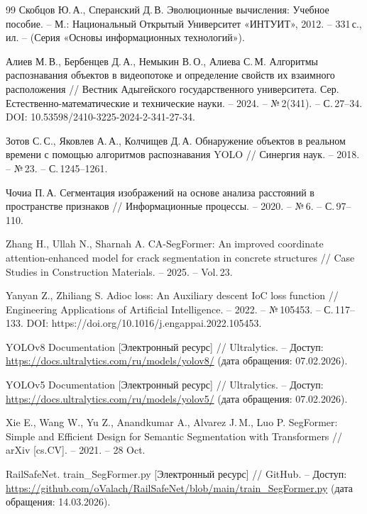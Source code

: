 \documentclass[areasetadvanced]{scrartcl}
\begin{document}
\newpage
{}
\begin{thebibliography}{99}
    Скобцов Ю.\,А., Сперанский Д.\,В. Эволюционные вычисления: Учебное пособие. – М.: Национальный Открытый Университет «ИНТУИТ», 2012. – 331\,с., ил. – (Серия «Основы информационных технологий»).

    Алиев М.\,В., Бербенцев Д.\,А., Немыкин В.\,О., Алиева С.\,М. Алгоритмы распознавания объектов в видеопотоке и определение свойств их взаимного расположения // Вестник Адыгейского государственного университета. Сер. Естественно-математические и технические науки. – 2024. – №\,2(341). – С.\,27–34. DOI: 10.53598/2410-3225-2024-2-341-27-34.

    Зотов С.\,С., Яковлев А.\,А., Колчищев Д.\,А. Обнаружение объектов в реальном времени с помощью алгоритмов распознавания YOLO // Синергия наук. – 2018. – №\,23. – С.\,1245–1261.

    Чочиа П.\,А. Сегментация изображений на основе анализа расстояний в пространстве признаков // Информационные процессы. – 2020. – №\,6. – С.\,97–110.

    Zhang H., Ullah N., Sharnah A. CA-SegFormer: An improved coordinate attention-enhanced model for crack segmentation in concrete structures // Case Studies in Construction Materials. – 2025. – Vol.\,23.

    Yanyan Z., Zhiliang S. Adioc loss: An Auxiliary descent IoC loss function // Engineering Applications of Artificial Intelligence. – 2022. – №\,105453. – С.\,117–133. DOI: https://doi.org/10.1016/j.engappai.2022.105453.

    YOLOv8 Documentation [Электронный ресурс] // Ultralytics. – Доступ: \url{https://docs.ultralytics.com/ru/models/yolov8/} (дата обращения: 07.02.2026).

    YOLOv5 Documentation [Электронный ресурс] // Ultralytics. – Доступ: \url{https://docs.ultralytics.com/ru/models/yolov5/} (дата обращения: 07.02.2026).

    Xie E., Wang W., Yu Z., Anandkumar A., Alvarez J.\,M., Luo P. SegFormer: Simple and Efficient Design for Semantic Segmentation with Transformers // arXiv [cs.CV]. – 2021. – 28 Oct.

    RailSafeNet. train\_SegFormer.py [Электронный ресурс] // GitHub. – Доступ: \url{https://github.com/oValach/RailSafeNet/blob/main/train_SegFormer.py} (дата обращения: 14.03.2026).


\end{thebibliography}
\end{document}
